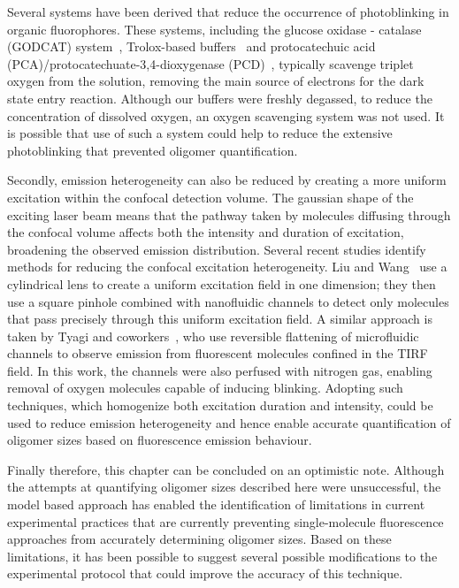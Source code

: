 Several systems have been derived that reduce the occurrence of photoblinking in organic fluorophores. These systems, including the glucose oxidase - catalase (GODCAT) system~\cite{joo2006}, Trolox-based buffers~\cite{rasnik2006} and protocatechuic acid (PCA)/protocatechuate-3,4-dioxygenase (PCD)~\cite{aitken2008}, typically scavenge triplet oxygen from the solution, removing the main source of electrons for the dark state entry reaction. Although our buffers were freshly degassed, to reduce the concentration of dissolved oxygen, an oxygen scavenging system was not used. It is possible that use of such a system could help to reduce the extensive photoblinking that prevented oligomer quantification. 

Secondly, emission heterogeneity can also be reduced by creating a more uniform excitation within the confocal detection volume. The gaussian shape of the exciting laser beam means that the pathway taken by molecules diffusing through the confocal volume affects both the intensity and duration of excitation, broadening the observed emission distribution. Several recent studies identify methods for reducing the confocal excitation heterogeneity. Liu and Wang~\cite{liu2008} use a cylindrical lens to create a uniform excitation field in one dimension; they then use a square pinhole combined with nanofluidic channels to detect only molecules that pass precisely through this uniform excitation field. A similar approach is taken by Tyagi and coworkers~\cite{tyagi2014}, who use reversible flattening of microfluidic channels to observe emission from fluorescent molecules confined in the TIRF field. In this work, the channels were also perfused with nitrogen gas, enabling removal of oxygen molecules capable of inducing blinking. Adopting such techniques, which homogenize both excitation duration and intensity, could be used to reduce emission heterogeneity and hence enable accurate quantification of oligomer sizes based on fluorescence emission behaviour.

Finally therefore, this chapter can be concluded on an optimistic note. Although the attempts at quantifying oligomer sizes described here were unsuccessful, the model based approach has enabled the identification of limitations in current experimental practices that are currently preventing single-molecule fluorescence approaches from accurately determining oligomer sizes. Based on these limitations, it has been possible to suggest several possible modifications to the experimental protocol that could improve the accuracy of this technique.